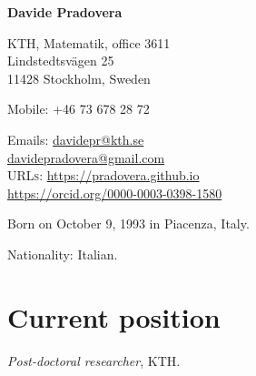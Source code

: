 \documentclass[11pt]{article} %
\begin{document}

\begin{minipage}[c]{.75\textwidth}
{\huge\bfseries Davide Pradovera} %
\bigskip\bigskip\medskip %

KTH, Matematik, office 3611 \\
Lindstedtsv\"agen 25 \\
11428 Stockholm, Sweden
\medskip %

Mobile: +46 73 678 28 72 %
\medskip %

Emails: \href{mailto:davidepr@kth.se}{davidepr@kth.se}\\ %
\phantom{Emails: }\href{mailto:davidepradovera@gmail.com}{davidepradovera@gmail.com}\\ %
\textsc{URLs}: \href{https://pradovera.github.io}{https://pradovera.github.io}\\ %
\href{https://orcid.org/0000-0003-0398-1580}{https://orcid.org/0000-0003-0398-1580}\\ %
\end{minipage}\hfill%
\begin{minipage}[c]{.225\textwidth}
\end{minipage}\hfill%

\smallskip %


Born on October 9, 1993 in Piacenza, Italy. %

Nationality: Italian. %


\medskip %

\section*{Current position}

\emph{Post-doctoral researcher}, KTH. %
\end{document}
